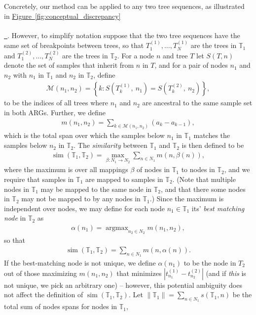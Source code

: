 \documentclass[10pt,twoside,lineno]{gsajnl}
\newcommand{\T}{\mathbb{T}}
\newcommand{\argmax}{\operatorname{argmax}}
\newcommand{\similarity}{\operatorname{sim}}
\newcommand*{\figref}[2][]{%
	\hyperref[{#2}]{%
		Figure~\ref*{#2}%
		\ifx\\#1\\%
		\else
		\,#1%
		\fi
	}%
}
\begin{document}
Concretely, our method can be applied to any two tree sequences,
as illustrated in \figref{fig:conceptual_discrepancy}.
However, to simplify notation suppose that the two tree sequences have the same set of breakpoints
between trees,
so that $T_1^{(1)}, \ldots, T_N^{(1)}$ are the trees in $\T_1$
and $T_1^{(2)}, \ldots, T_N^{(2)}$ are the trees in $\T_2$.
For a node $n$ and tree $T$
let $S(T, n)$ denote the set of samples that inherit from $n$ in $T$,
and for a pair of nodes $n_1$ and $n_2$ with $n_1$ in $\T_1$ and $n_2$ in $\T_2$,
define
\begin{align*}
	\mathcal{M}(n_1, n_2) = \left\{ k : S\left(T^{(1)}_k,\ n_1\right) = S\left(T^{(2)}_k,\ n_2\right) \right\},
\end{align*}
to be the indices of all trees where $n_1$ and $n_2$ are ancestral to the same sample set in both ARGs.
Further, we define
\begin{align*}
    m(n_1, n_2)
    =
    \sum_{k\in \mathcal{M}(n_1, n_2)} (a_k - a_{k-1}) ,  
\end{align*}
which is the total span over which the samples below $n_1$ in $\T_1$
matches the samples below $n_2$ in $\T_2$.
The \emph{similarity} between $\T_1$ and $\T_2$ is then defined to be
\begin{align*}
    \similarity(\T_1, \T_2)
    =
    \max_{\beta:N_1 \to N_2} \sum_{n \in N_1} m(n, \beta(n)) ,
\end{align*}
where the maximum is over all mappings $\beta$ of nodes in $\T_1$ to nodes in $\T_2$, and we require that samples in $\T_1$ are mapped to samples in $\T_2$.
(Note that multiple nodes in $\T_1$ may be mapped to the same node in $\T_2$,
and that there some nodes in $\T_2$ may not be mapped to by any nodes in $\T_1$.)
Since the maximum is independent over nodes, we may define for each node $n_1 \in \T_1$
its' \emph{best matching node} in $\T_2$ as
\begin{align*}
    \alpha(n_1) = \argmax_{n_2 \in N_2} m(n_1, n_2) ,
\end{align*}
so that
\begin{align*}
    \similarity(\T_1, \T_2)
    =
    \sum_{n \in N_1} m(n, \alpha(n)) .
\end{align*}
If the best-matching node is not unique, we define $\alpha(n_1)$ to be the node in $T_2$
out of those maximizing $m(n_1, n_2)$ that minimizes $|t^{(1)}_{n_1} - t^{(2)}_{n_2}|$
(and if \emph{this} is not unique, we pick an arbitrary one) --
however, this potential ambiguity does not affect the definition of $\similarity(\T_1, \T_2)$.
Let $\|\T_1\|=\sum_{n\in N_1}s(\T_1,n)$ be the total sum of nodes spans for nodes in $\T_1$,
\end{document}
